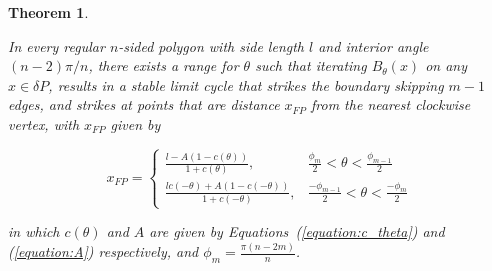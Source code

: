 \documentclass[letterpaper, 10 pt, conference]{ieeeconf}  %
\newtheorem{theorem}{\bf Theorem}
\begin{document}
\begin{theorem} \label{Theorem:1}

In every regular $n$-sided polygon with side
length $l$ and interior angle $(n - 2)\pi/n$, there exists a range for 
$\theta$ such that iterating $B_{\theta}(x)$ on any $x \in \delta P$, 
results in a stable limit cycle that strikes the boundary skipping $m-1$ 
edges, and strikes at points that are distance $x_{FP}$ from the nearest 
clockwise vertex, with $x_{FP}$ given by

\begin{equation} \label{x-multi-bounce}
x_{FP} = 
\begin{cases}
        \frac{l-A(1-c(\theta))}{1+c(\theta)}, \qquad & \frac{\phi_m}{2} < \theta
< \frac{\phi_{m-1}}{2} \\
        \frac{lc(-\theta) + A(1-c(-\theta))}{1+c(-\theta)}, & \frac{-\phi_{m-1}}{2} 
< \theta < \frac{-\phi_m}{2}
\end{cases}
\end{equation}

\noindent in which $c(\theta)$ and $A$ are given by 
Equations~(\ref{equation:c_theta}) and (\ref{equation:A}) respectively,
and $\phi_m = \frac{\pi(n-2m)}{n}$.

\end{theorem}
\end{document}
